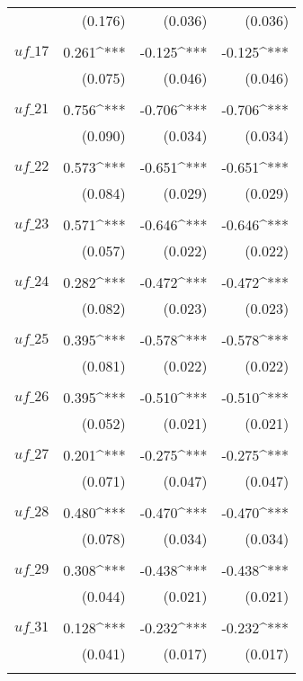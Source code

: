 \begin{apendicesenv}
\begin{longtable}{@{\extracolsep{5pt}}lD{.}{.}{-3} D{.}{.}{-3} D{.}{.}{-3} }
		& (0.176) & (0.036) & (0.036) \\
		& & & \\
	   $uf\_17$ & 0.261^{***} & -0.125^{***} & -0.125^{***} \\
		& (0.075) & (0.046) & (0.046) \\ 
		& & & \\
	   $uf\_21$ & 0.756^{***} & -0.706^{***} & -0.706^{***} \\
		& (0.090) & (0.034) & (0.034) \\
		& & & \\
	   $uf\_22$ & 0.573^{***} & -0.651^{***} & -0.651^{***} \\ 
		& (0.084) & (0.029) & (0.029) \\
		& & & \\
	   $uf\_23$ & 0.571^{***} & -0.646^{***} & -0.646^{***} \\
		& (0.057) & (0.022) & (0.022) \\
		& & & \\
	   $uf\_24$ & 0.282^{***} & -0.472^{***} & -0.472^{***} \\ 
		& (0.082) & (0.023) & (0.023) \\
		& & & \\
	   $uf\_25$ & 0.395^{***} & -0.578^{***} & -0.578^{***} \\
		& (0.081) & (0.022) & (0.022) \\
		& & & \\
	   $uf\_26$ & 0.395^{***} & -0.510^{***} & -0.510^{***} \\
		& (0.052) & (0.021) & (0.021) \\
		& & & \\
	   $uf\_27$ & 0.201^{***} & -0.275^{***} & -0.275^{***} \\ 
		& (0.071) & (0.047) & (0.047) \\
		& & & \\
	   $uf\_28$ & 0.480^{***} & -0.470^{***} & -0.470^{***} \\
		& (0.078) & (0.034) & (0.034) \\
		& & & \\
	   $uf\_29$ & 0.308^{***} & -0.438^{***} & -0.438^{***} \\
		& (0.044) & (0.021) & (0.021) \\
		& & & \\
	   $uf\_31$ & 0.128^{***} & -0.232^{***} & -0.232^{***} \\ 
		& (0.041) & (0.017) & (0.017) \\
		& & & \\

\end{longtable}
\end{apendicesenv}
